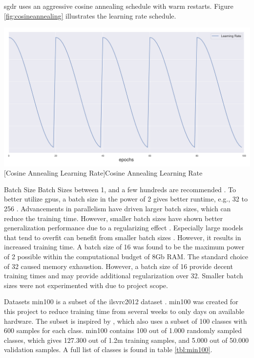 \begin{enumdescript}
\begin{enumdescript}
		\gls{sgdr} uses an aggressive cosine annealing schedule with warm restarts. Figure \ref{fig:cosineannealing} illustrates the learning rate schedule.
		
		\begin{minipage}[t]{\linewidth}
			\centering
			\includegraphics[width=.7\linewidth]{figures/lr.png}
			[Cosine Annealing Learning Rate]{Cosine Annealing Learning Rate} 
			\label{fig:cosineannealing}
		\end{minipage}
		
		\item[Batch Size] Batch Sizes between 1, and a few hundreds are recommended \cite{bengio_practical_2012}. To better utilize \gls{gpu}s, a batch size in the power of 2 gives better runtime, e.g., 32 to 256 \cite{goodfellow_deep_2016}. Advancements in parallelism \cite{dean_large_2012} have driven larger batch sizes, which can reduce the training time. However, smaller batch sizes have shown better generalization performance due to a regularizing effect \cite{masters_revisiting_nodate}. Especially large models that tend to overfit can benefit from smaller batch sizes \cite{goodfellow_deep_2016}. However, it results in increased training time.
		A batch size of 16 was found to be the maximum power of 2 possible within the computational budget of 8Gb RAM. The standard choice of 32 caused memory exhaustion. However, a batch size of 16 provide decent training times and may provide additional regularization over 32. Smaller batch sizes were not experimented with due to project scope.
		
		\item[Datasets] \gls{min100} is a subset of the \gls{ilsvrc2012} dataset \cite{russakovsky_imagenet_2015}. \gls{min100} was created for this project to reduce training time from several weeks to only days on available hardware. The subset is inspired by \cite{vinyals_matching_2016}, which also uses a subset of 100 classes with 600 samples for each class. \gls{min100} contains 100 out of 1.000 randomly sampled classes, which gives 127.300 out of 1.2m training samples, and 5.000 out of 50.000 validation samples. A full list of classes is found in table \ref{tbl:min100}. 
		

\end{enumdescript}
\end{enumdescript}

